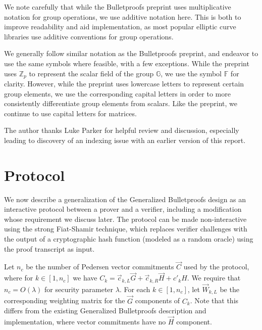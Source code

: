 \documentclass{article}
\newcommand{\GG}{\mathbb{G}}
\newcommand{\FF}{\mathbb{F}}
\newcommand{\mat}[1]{\vec{#1}}
\begin{document}
We note carefully that while the Bulletproofs preprint uses multiplicative notation for group operations, we use additive notation here.
This is both to improve readability and aid implementation, as most popular elliptic curve libraries use additive conventions for group operations.

We generally follow similar notation as the Bulletproofs preprint, and endeavor to use the same symbols where feasible, with a few exceptions.
While the preprint uses $\mathbb{Z}_p$ to represent the scalar field of the group $\GG$, we use the symbol $\FF$ for clarity.
However, while the preprint uses lowercase letters to represent certain group elements, we use the corresponding capital letters in order to more consistently differentiate group elements from scalars.
Like the preprint, we continue to use capital letters for matrices.

The author thanks Luke Parker for helpful review and discussion, especially leading to discovery of an indexing issue with an earlier version of this report.


\section{Protocol}

We now describe a generalization of the Generalized Bulletproofs design as an interactive protocol between a prover and a verifier, including a modification whose requirement we discuss later.
The protocol can be made non-interactive using the strong Fiat-Shamir technique, which replaces verifier challenges with the output of a cryptographic hash function (modeled as a random oracle) using the proof transcript as input.

Let $n_c$ be the number of Pedersen vector commitments $\vec{C}$ used by the protocol, where for $k \in [1, n_c]$ we have $C_k = \vec{c}_{k,L} \vec{G} + \vec{c}_{k,R} \vec{H} + c'_k H$.
We require that $n_c = O(\lambda)$ for security parameter $\lambda$.
For each $k \in [1, n_c]$, let $\mat{W}_{k,L}$ be the corresponding weighting matrix for the $\vec{G}$ components of $C_k$.
Note that this differs from the existing Generalized Bulletproofs description and implementation, where vector commitments have no $\vec{H}$ component.
\end{document}
